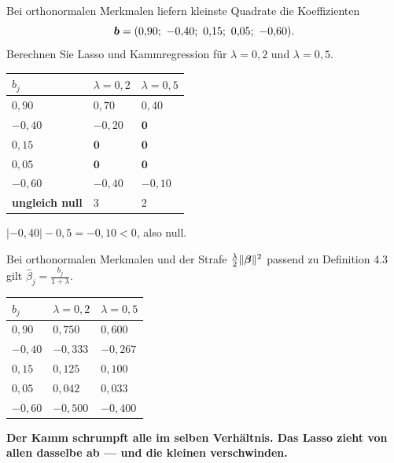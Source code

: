 \begin{aufgabe}
Bei orthonormalen Merkmalen liefern kleinste Quadrate die Koeffizienten
\[ \vek b = (0{,}90;\ -0{,}40;\ 0{,}15;\ 0{,}05;\ -0{,}60) . \]
Berechnen Sie Lasso und Kammregression für $\lambda = 0{,}2$ und $\lambda = 0{,}5$.

\loesung
{}
\begin{center}
{\small
\renewcommand{\arraystretch}{1.48}
\begin{tabular}{@{}P{1.6cm}P{2.2cm}P{2.2cm}@{}}
\toprule
$b_j$ & $\lambda = 0{,}2$ & $\lambda = 0{,}5$\\
\midrule
$0{,}90$ & $0{,}70$ & $0{,}40$\\
$-0{,}40$ & $-0{,}20$ & $\mathbf{0}$\\
$0{,}15$ & $\mathbf{0}$ & $\mathbf{0}$\\
$0{,}05$ & $\mathbf{0}$ & $\mathbf{0}$\\
$-0{,}60$ & $-0{,}40$ & $-0{,}10$\\
\midrule
\textbf{ungleich null} & $3$ & $2$\\
\bottomrule
\end{tabular}}
\end{center}

 $|{-0{,}40}| - 0{,}5 = -0{,}10 < 0$, also null.

Bei orthonormalen Merkmalen und der Strafe $\frac{\lambda}{2}\|\boldsymbol{\beta}\|^{2}$ passend zu Definition 4.3 gilt $\hat\beta_j = \frac{b_j}{1+\lambda}$.

\begin{center}
{\small
\renewcommand{\arraystretch}{1.48}
\begin{tabular}{@{}P{1.6cm}P{2.2cm}P{2.2cm}@{}}
\toprule
$b_j$ & $\lambda = 0{,}2$ & $\lambda = 0{,}5$\\
\midrule
$0{,}90$ & $0{,}750$ & $0{,}600$\\
$-0{,}40$ & $-0{,}333$ & $-0{,}267$\\
$0{,}15$ & $0{,}125$ & $0{,}100$\\
$0{,}05$ & $0{,}042$ & $0{,}033$\\
$-0{,}60$ & $-0{,}500$ & $-0{,}400$\\
\bottomrule
\end{tabular}}
\end{center}

\begin{center}
\begin{minipage}{0.9\textwidth}
\textbf{Der Kamm schrumpft alle im selben Verhältnis. Das Lasso zieht von allen dasselbe ab --- und die kleinen verschwinden.}
\end{minipage}
\end{center}


\end{aufgabe}
